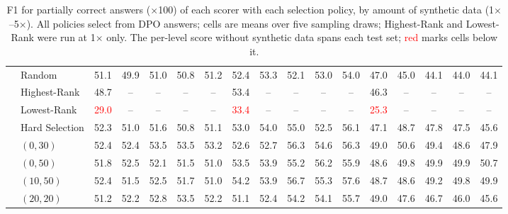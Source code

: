 \begin{table}[t]
\begin{tabular}{llccccccccccccccc}
 & Random & 51.1 & 49.9 & 51.0 & 50.8 & 51.2 & 52.4 & 53.3 & 52.1 & 53.0 & 54.0 & 47.0 & 45.0 & 44.1 & 44.0 & 44.1 \\
 & Highest-Rank & 48.7 & -- & -- & -- & -- & 53.4 & -- & -- & -- & -- & 46.3 & -- & -- & -- & -- \\
 & Lowest-Rank & \textcolor{red}{29.0} & -- & -- & -- & -- & \textcolor{red}{33.4} & -- & -- & -- & -- & \textcolor{red}{25.3} & -- & -- & -- & -- \\
 & Hard Selection & 52.3 & 51.0 & 51.6 & 50.8 & 51.1 & 53.0 & 54.0 & 55.0 & 52.5 & 56.1 & 47.1 & 48.7 & 47.8 & 47.5 & 45.6 \\
 & $(0, 30)$ & 52.4 & 52.4 & 53.5 & 53.5 & 53.2 & 52.6 & 52.7 & 56.3 & 54.6 & 56.3 & 49.0 & 50.6 & 49.4 & 48.6 & 47.9 \\
 & $(0, 50)$ & 51.8 & 52.5 & 52.1 & 51.5 & 51.0 & 53.5 & 53.9 & 55.2 & 56.2 & 55.9 & 48.6 & 49.8 & 49.9 & 49.9 & 50.7 \\
 & $(10, 50)$ & 52.4 & 51.5 & 52.5 & 51.7 & 51.0 & 54.2 & 53.9 & 56.7 & 55.3 & 57.6 & 48.7 & 48.6 & 49.2 & 49.8 & 49.9 \\
 & $(20, 20)$ & 51.2 & 52.2 & 52.8 & 53.5 & 52.2 & 51.1 & 52.4 & 54.2 & 54.1 & 55.7 & 49.0 & 47.6 & 46.7 & 46.0 & 45.6 \\
\bottomrule
\end{tabular}
\caption{F1 for partially correct answers ($\times$100) of each scorer with each selection policy, by amount of synthetic data (1$\times$--5$\times$). All policies select from DPO answers; cells are means over five sampling draws; Highest-Rank and Lowest-Rank were run at 1$\times$ only. The per-level score without synthetic data spans each test set; \textcolor{red}{red} marks cells below it.}
\label{tab:appendix-selection-amount-level-1}
\end{table}


